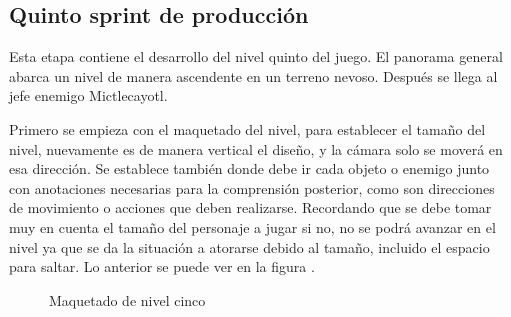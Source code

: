 
\subsection{Quinto sprint de producción}

Esta etapa contiene el desarrollo del nivel quinto del juego. El panorama general abarca un nivel de manera ascendente en un terreno nevoso. Después se llega al jefe enemigo Mictlecayotl.

Primero se empieza con el maquetado del nivel, para establecer el tamaño del nivel, nuevamente es de manera vertical el diseño, y la cámara solo se moverá en esa dirección. Se establece también donde debe ir cada objeto o enemigo junto con anotaciones necesarias para la comprensión posterior, como son direcciones de movimiento o acciones que deben realizarse. Recordando que se debe tomar muy en cuenta el tamaño del personaje a jugar si no, no se podrá avanzar en el nivel ya que se da la situación a atorarse debido al tamaño, incluido el espacio para saltar. Lo anterior se puede ver en la figura \cite{fig:n501}.
\begin{figure}[htbp]
	\centering
	\caption{Maquetado de nivel cinco} \label{fig:n501}
\end{figure}  

